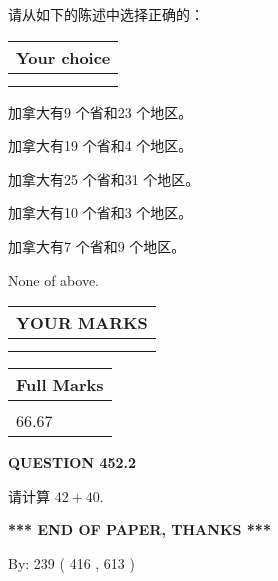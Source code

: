 \documentclass{ctexart}
\begin{document}
  
请从如下的陈述中选择正确的：
  
  
\noindent\hspace{3.0in} \begin{tabular}{|l|}
\hline
Your choice \\
\hline
 \\ 
 \\ 
\hline
\end{tabular}
  
  
 
 
加拿大有9 个省和23 个地区。
 
 
加拿大有19 个省和4 个地区。
 
 
加拿大有25 个省和31 个地区。
 
 
加拿大有10 个省和3 个地区。
 
 
加拿大有7 个省和9 个地区。
 
 
 None of above.
 
 
  
\vspace{0.2in}
  
\noindent\begin{tabular}{|l|}
\hline
 YOUR MARKS  \\
\hline
 \\ 
 \\ 
\hline
\end{tabular}
\hspace{0.05in} \begin{tabular}{|l|}
\hline
 Full Marks  \\
\hline
 \\ 
66.67 \\
\hline
\end{tabular}
{\textbf{\Large{QUESTION
452.2 
}}}
  
  
 
请计算 $ %
42 +  %
40 $.
 

 

 
   
   
 \vspace{0.2in}
 
   
   
   
   
\vspace{1.0in} 
{\textbf{\large{ *** END OF PAPER, THANKS *** }}} 
   
   
\hspace{1.0in} By: 
 239 ( 416 ,  613 )
   
\end{document}
